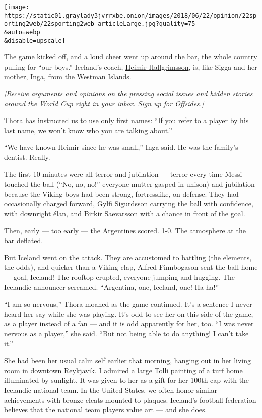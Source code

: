 \texttt{[image: https://static01.graylady3jvrrxbe.onion/images/2018/06/22/opinion/22sporting2web/22sporting2web-articleLarge.jpg?quality=75\\\&auto=webp\\\&disable=upscale]}

The game kicked off, and a loud cheer went up around the bar, the whole
country pulling for ``our boys.'' Iceland's coach,
\href{https://en.wikipedia.org/wiki/Heimir_Hallgr\%C3\%ADmsson}{Heimir
Hallgrimsson}, is, like Sigga and her mother, Inga, from the Westman
Islands.

\href{https://www.nytimes3xbfgragh.onion/newsletters/offsides?action=click\&module=Intentional\&pgtype=Article}{\emph{{[}Receive
arguments and opinions on the pressing social issues and hidden stories
around the World Cup right in your inbox. Sign up for Offsides.{]}}}

Thora has instructed us to use only first names: ``If you refer to a
player by his last name, we won't know who you are talking about.''

``We have known Heimir since he was small,'' Inga said. He was the
family's dentist. Really.

The first 10 minutes were all terror and jubilation --- terror every
time Messi touched the ball (``No, no, no!'' everyone mutter-gasped in
unison) and jubilation because the Viking boys had been strong,
fortresslike, on defense. They had occasionally charged forward, Gylfi
Sigurdsson carrying the ball with confidence, with downright élan, and
Birkir Saevarsson with a chance in front of the goal.

Then, early --- too early --- the Argentines scored. 1-0. The atmosphere
at the bar deflated.

But Iceland went on the attack. They are accustomed to battling (the
elements, the odds), and quicker than a Viking clap, Alfred Finnbogason
sent the ball home --- goal, Iceland! The rooftop erupted, everyone
jumping and hugging. The Icelandic announcer screamed. ``Argentina, one,
Iceland, one! Ha ha!''

``I am so nervous,'' Thora moaned as the game continued. It's a sentence
I never heard her say while she was playing. It's odd to see her on this
side of the game, as a player instead of a fan --- and it is odd
apparently for her, too. ``I was never nervous as a player,'' she said.
``But not being able to do anything! I can't take it.''

She had been her usual calm self earlier that morning, hanging out in
her living room in downtown Reykjavik. I admired a large Tolli painting
of a turf home illuminated by sunlight. It was given to her as a gift
for her 100th cap with the Icelandic national team. In the United
States, we often honor similar achievements with bronze cleats mounted
to plaques. Iceland's football federation believes that the national
team players value art --- and she does.

